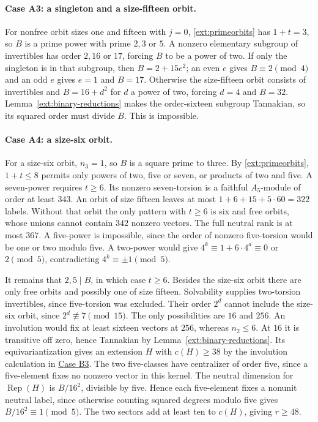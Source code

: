 \documentclass[11pt]{amsart}
\numberwithin{equation}{section}
\theoremstyle{definition}
\theoremstyle{plain}
\begin{document}
\paragraph{Case A3: a singleton and a size-fifteen orbit.}\label{ext:neutral-A3}
For nonfree orbit sizes one and fifteen with $j=0$,
\eqref{ext:primeorbits} has $1+t=3$, so $B$ is a prime power with
prime $2,3$ or $5$. A nonzero elementary subgroup of invertibles has
order $2,16$ or $17$, forcing $B$ to be a power of two. If only the
singleton is in that subgroup, then $B=2+15e^2$; an even $e$ gives
$B\equiv2\pmod4$ and an odd $e$ gives $e=1$ and $B=17$.
Otherwise the size-fifteen orbit consists of invertibles and
$B=16+d^2$ for $d$ a power of two, forcing $d=4$ and $B=32$.
Lemma~\ref{ext:binary-reductions} makes the order-sixteen subgroup
Tannakian, so its squared order must divide $B$.
This is impossible.

\paragraph{Case A4: a size-six orbit.}\label{ext:neutral-A4}
For a size-six orbit, $n_3=1$, so $B$ is a square prime to three.
By \eqref{ext:primeorbits}, $1+t\le8$ permits only powers of two,
five or seven, or products of two and five. A seven-power requires
$t\ge6$. Its nonzero seven-torsion is a faithful $A_5$-module of
order at least $343$. An orbit of size fifteen leaves at most
$1+6+15+5\cdot60=322$ labels. Without that orbit the only pattern
with $t\ge6$ is six and free orbits, whose unions cannot contain
$342$ nonzero vectors. The full neutral rank is at most $367$.
A five-power is impossible, since the order of nonzero five-torsion
would be one or two modulo five. A two-power would give
$4^k\equiv1+6\cdot4^a\equiv0$ or $2\pmod5$, contradicting
$4^k\equiv\pm1\pmod5$.

It remains that $2,5\mid B$, in which case $t\ge6$. Besides the
size-six orbit there are only free orbits and possibly one of size
fifteen. Solvability supplies two-torsion invertibles, since
five-torsion was excluded. Their order $2^d$ cannot include the
size-six orbit, since $2^d\not\equiv7\pmod{15}$. The only
possibilities are $16$ and $256$. An involution would fix at least
sixteen vectors at $256$, whereas $n_2\le6$. At $16$ it is transitive off zero, hence Tannakian by
Lemma~\ref{ext:binary-reductions}.
Its equivariantization gives an extension $H$ with $c(H)\ge38$ by the
involution calculation in \hyperref[ext:neutral-B3]{Case B3}.
The two five-classes have centralizer of order five, since a
five-element fixes no nonzero vector in this kernel. The neutral
dimension for $\operatorname{Rep}(H)$ is $B/16^2$, divisible by five.
Hence each five-element fixes a nonunit neutral label, since otherwise
counting squared degrees modulo five gives $B/16^2\equiv1\pmod5$.
The two sectors add at least ten to $c(H)$, giving $r\ge48$.
\end{document}
